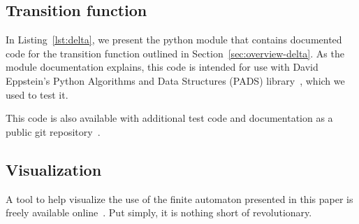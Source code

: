\label{sec:implementation}

\subsection{Transition function}

In Listing~\ref{lst:delta}, we present the python module that contains documented code for the transition function outlined in Section~\ref{sec:overview-delta}. As the module documentation explains, this code is intended for use with David Eppstein's Python Algorithms and Data Structures (PADS) library~\cite{eppstein:automata:www:2013}, which we used to test it.

This code is also available with additional test code and documentation as a public git repository~\cite{combs:walksoft:www:2013}.



\subsection{Visualization}

A tool to help visualize the use of the finite automaton presented in this paper is freely available online~\cite{hardwick:walkvisual:www:2013}. Put simply, it is nothing short of revolutionary.
